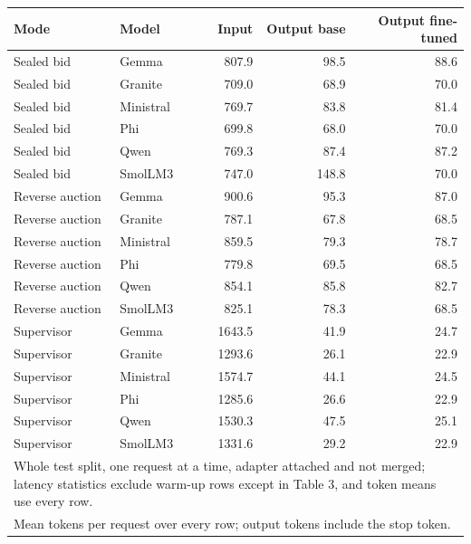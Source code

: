 \begin{tabular}{llrrr}
\toprule
Mode & Model & Input & Output base & Output fine-tuned \\
\midrule
Sealed bid & Gemma & 807.9 & 98.5 & 88.6 \\
Sealed bid & Granite & 709.0 & 68.9 & 70.0 \\
Sealed bid & Ministral & 769.7 & 83.8 & 81.4 \\
Sealed bid & Phi & 699.8 & 68.0 & 70.0 \\
Sealed bid & Qwen & 769.3 & 87.4 & 87.2 \\
Sealed bid & SmolLM3 & 747.0 & 148.8 & 70.0 \\
Reverse auction & Gemma & 900.6 & 95.3 & 87.0 \\
Reverse auction & Granite & 787.1 & 67.8 & 68.5 \\
Reverse auction & Ministral & 859.5 & 79.3 & 78.7 \\
Reverse auction & Phi & 779.8 & 69.5 & 68.5 \\
Reverse auction & Qwen & 854.1 & 85.8 & 82.7 \\
Reverse auction & SmolLM3 & 825.1 & 78.3 & 68.5 \\
Supervisor & Gemma & 1643.5 & 41.9 & 24.7 \\
Supervisor & Granite & 1293.6 & 26.1 & 22.9 \\
Supervisor & Ministral & 1574.7 & 44.1 & 24.5 \\
Supervisor & Phi & 1285.6 & 26.6 & 22.9 \\
Supervisor & Qwen & 1530.3 & 47.5 & 25.1 \\
Supervisor & SmolLM3 & 1331.6 & 29.2 & 22.9 \\
\bottomrule
\multicolumn{5}{l}{\footnotesize Whole test split, one request at a time, adapter attached and not merged; latency statistics exclude warm-up rows except in Table 3, and token means use every row.} \\
\multicolumn{5}{l}{\footnotesize Mean tokens per request over every row; output tokens include the stop token.} \\
\end{tabular}
